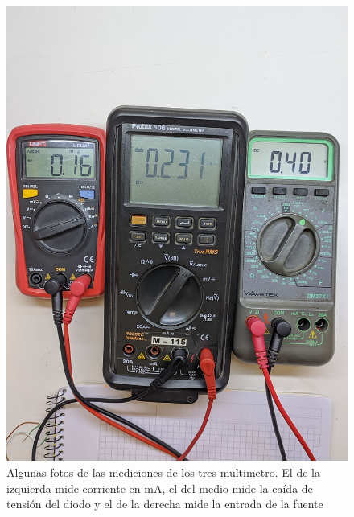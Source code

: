 \documentclass[chaptersright]{informeutn}
\begin{document}
\begin{figure}[!ht]
\begin{minipage}{0.25\textwidth}
          \includegraphics[width=1\textwidth]{pictures/mult_crkt-2_07.jpg}
        \end{minipage}
        \caption{Algunas fotos de las mediciones de los tres multimetro. El de la izquierda mide corriente en mA, el
        del medio mide la caída de tensión del diodo y el de la derecha mide la entrada de la fuente}
      \end{figure}

      \begin{table}[H]
        \caption{Tabla de valores medidos del diodo de germanio.}
        \label{table.Ge}
      \end{table}
\end{document}

